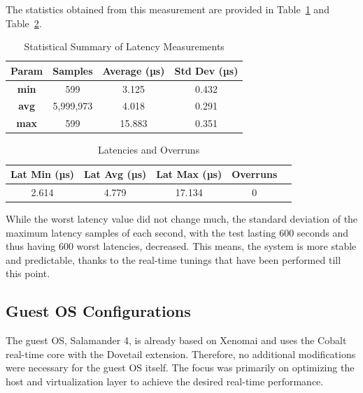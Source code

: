 \documentclass[MMR,Master,english]{twbook}
\begin{document}
\clearpage

\noindent The statistics obtained from this measurement are provided in Table~\ref{tab:latency_stats_virt_qemu} and Table~\ref{tab:latency_overrun_msw_new_virt_qemu}.

\begin{table}[H]
	\centering
	\caption{Statistical Summary of Latency Measurements}
	\label{tab:latency_stats_virt_qemu}
	\begin{tabular}{|c|c|c|c|}
		\hline
		\textbf{Param} & \textbf{Samples} & \textbf{Average (µs)} & \textbf{Std Dev (µs)} \\ \hline
		\textbf{min}   & 599              & 3.125        & 0.432                 \\ \hline
		\textbf{avg}   & 5,999,973        & 4.018        & 0.291                 \\ \hline
		\textbf{max}   & 599              & 15.883       & 0.351                 \\ \hline
	\end{tabular}
\end{table}

\begin{table}[H]
	\centering
	\caption{Latencies and Overruns}
	\label{tab:latency_overrun_msw_new_virt_qemu}
	\begin{tabular}{|c|c|c|c|c|}
		\hline
		\textbf{Lat Min (µs)} & \textbf{Lat Avg (µs)} & \textbf{Lat Max (µs)} & \textbf{Overruns} \\ \hline
		2.614                 & 4.779                 & 17.134                & 0                 \\ \hline
	\end{tabular}
\end{table}

\noindent While the worst latency value did not change much, the standard deviation of the maximum latency samples of each second, with the test lasting 600 seconds and thus having 600 worst latencies, decreased. This means, the system is more stable and predictable, thanks to the real-time tunings that have been performed till this point.

\subsection{Guest OS Configurations}\label{subsec:guest_configurations}
The guest OS, Salamander 4, is already based on Xenomai and uses the Cobalt real-time core with the Dovetail extension. Therefore, no additional modifications were necessary for the guest OS itself. The focus was primarily on optimizing the host and virtualization layer to achieve the desired real-time performance.
\end{document}
